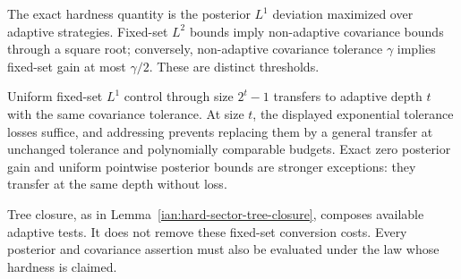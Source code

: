 \begin{remark}\label{ian:adaptive-fixed-set-scope}
The exact hardness quantity is the posterior \(L^1\) deviation maximized over adaptive strategies. Fixed-set \(L^2\) bounds imply non-adaptive covariance bounds through a square root; conversely, non-adaptive covariance tolerance \(\gamma\) implies fixed-set gain at most \(\gamma/2\). These are distinct thresholds.

Uniform fixed-set \(L^1\) control through size \(2^t-1\) transfers to adaptive depth \(t\) with the same covariance tolerance. At size \(t\), the displayed exponential tolerance losses suffice, and addressing prevents replacing them by a general transfer at unchanged tolerance and polynomially comparable budgets. Exact zero posterior gain and uniform pointwise posterior bounds are stronger exceptions: they transfer at the same depth without loss.

Tree closure, as in Lemma~\ref{ian:hard-sector-tree-closure}, composes available adaptive tests. It does not remove these fixed-set conversion costs. Every posterior and covariance assertion must also be evaluated under the law whose hardness is claimed.
\end{remark}
